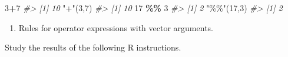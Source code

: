 \documentclass[
]{book}
\newenvironment{Shaded}{\begin{snugshade}}{\end{snugshade}}
\newcommand{\CommentTok}[1]{\textcolor[rgb]{0.56,0.35,0.01}{\textit{#1}}}
\newcommand{\DecValTok}[1]{\textcolor[rgb]{0.00,0.00,0.81}{#1}}
\newcommand{\NormalTok}[1]{#1}
\newcommand{\SpecialCharTok}[1]{\textcolor[rgb]{0.81,0.36,0.00}{\textbf{#1}}}
\newcommand{\StringTok}[1]{\textcolor[rgb]{0.31,0.60,0.02}{#1}}
\providecommand{\tightlist}{%
  \setlength{\itemsep}{0pt}\setlength{\parskip}{0pt}}
\begin{document}
\begin{Shaded}
\begin{Highlighting}[]
\DecValTok{3}\SpecialCharTok{+}\DecValTok{7}
\CommentTok{\#\textgreater{} [1] 10}
\StringTok{"+"}\NormalTok{(}\DecValTok{3}\NormalTok{,}\DecValTok{7}\NormalTok{)}
\CommentTok{\#\textgreater{} [1] 10}
\DecValTok{17} \SpecialCharTok{\%\%} \DecValTok{3}
\CommentTok{\#\textgreater{} [1] 2}
\StringTok{"\%\%"}\NormalTok{(}\DecValTok{17}\NormalTok{,}\DecValTok{3}\NormalTok{)}
\CommentTok{\#\textgreater{} [1] 2}
\end{Highlighting}
\end{Shaded}

\begin{enumerate}
\def\labelenumi{(\alph{enumi})}
\setcounter{enumi}{1}
\tightlist
\item
  Rules for operator expressions with vector arguments.
\end{enumerate}

Study the results of the following R instructions.
\end{document}
